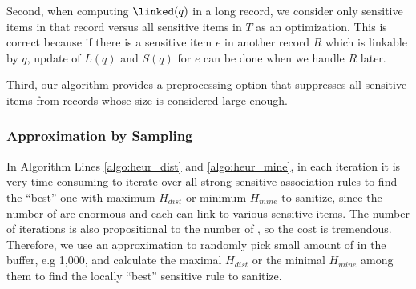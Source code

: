 Second, when computing
$\linked(q)$ in a long record, we consider only sensitive items in that
record versus all sensitive items in $T$ as an optimization. This is correct
because if there is a sensitive item $e$ in another record $R$ which is
linkable by $q$, update of $L(q)$ and $S(q)$ for $e$ can be done when we
handle $R$ later.

Third, our algorithm provides a preprocessing option that
suppresses all sensitive items from records whose size is considered large
enough.

\subsubsection{Approximation by Sampling}
In Algorithm \SanitizeBuffer Lines \ref{algo:heur_dist} and
\ref{algo:heur_mine}, in each iteration it is very time-consuming to iterate
over all strong sensitive association rules to find the ``best'' one with
maximum $H_{dist}$ or minimum $H_{mine}$ to sanitize, since the number of
\qids are enormous and each \qid can link to various sensitive items.
The number of iterations is also propositional to the number of \qids, so
the cost is tremendous. Therefore, we use an approximation to randomly
pick small amount of \qids in the buffer, e.g 1,000, and calculate the
maximal $H_{dist}$ or the minimal $H_{mine}$ among them to find the locally
``best'' sensitive rule to sanitize.
%

